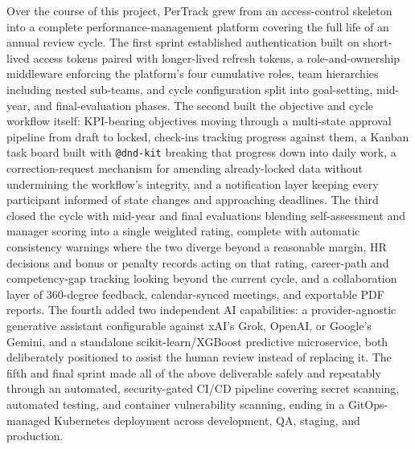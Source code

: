 \documentclass[12pt,a4paper]{report}
\begin{document}
Over the course of this project, PerTrack grew from an access-control skeleton into a complete performance-management platform covering the full life of an annual review cycle. The first sprint established authentication built on short-lived access tokens paired with longer-lived refresh tokens, a role-and-ownership middleware enforcing the platform's four cumulative roles, team hierarchies including nested sub-teams, and cycle configuration split into goal-setting, mid-year, and final-evaluation phases. The second built the objective and cycle workflow itself: KPI-bearing objectives moving through a multi-state approval pipeline from draft to locked, check-ins tracking progress against them, a Kanban task board built with \texttt{@dnd-kit} breaking that progress down into daily work, a correction-request mechanism for amending already-locked data without undermining the workflow's integrity, and a notification layer keeping every participant informed of state changes and approaching deadlines. The third closed the cycle with mid-year and final evaluations blending self-assessment and manager scoring into a single weighted rating, complete with automatic consistency warnings where the two diverge beyond a reasonable margin, HR decisions and bonus or penalty records acting on that rating, career-path and competency-gap tracking looking beyond the current cycle, and a collaboration layer of 360-degree feedback, calendar-synced meetings, and exportable PDF reports. The fourth added two independent AI capabilities: a provider-agnostic generative assistant configurable against xAI's Grok, OpenAI, or Google's Gemini, and a standalone scikit-learn/XGBoost predictive microservice, both deliberately positioned to assist the human review instead of replacing it. The fifth and final sprint made all of the above deliverable safely and repeatably through an automated, security-gated CI/CD pipeline covering secret scanning, automated testing, and container vulnerability scanning, ending in a GitOps-managed Kubernetes deployment across development, QA, staging, and production.
\end{document}
